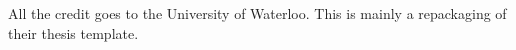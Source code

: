 All the credit goes to the University of Waterloo. This is mainly a repackaging of their thesis template. 